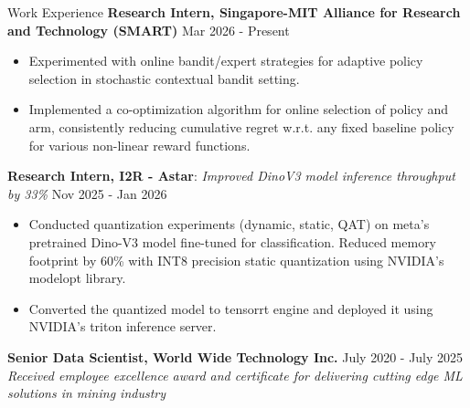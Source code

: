 \documentclass{resume} %
\begin{document}
\begin{rSection}{Work Experience}
\color{black}
\textbf{Research Intern, Singapore-MIT Alliance for Research and Technology (SMART)} \hfill Mar 2026 - Present
\begin{itemize}[leftmargin=1em,itemsep=-6pt, topsep=-5pt, before={\vspace{-0.3ex}},after=\vspace{0.5ex}]

\item \begingroup \spaceskip=2.5pt
    Experimented with online bandit/expert strategies for adaptive policy selection in stochastic contextual bandit setting.
\endgroup
\item \begingroup \spaceskip=2.5pt
    Implemented a co-optimization algorithm for online selection of policy and arm, consistently reducing cumulative regret w.r.t. any fixed baseline policy for various non-linear reward functions.
\endgroup
\end{itemize}

\vspace{-2pt}
\textbf{Research Intern, I2R - Astar}: \emph{Improved DinoV3 model inference throughput by 33\%} \hfill Nov 2025 - Jan 2026
\begin{itemize}[leftmargin=1em,itemsep=-6pt, topsep=-5pt, before={\vspace{-0.3ex}},after=\vspace{0.5ex}]
\item  \begingroup
	\spaceskip=2.5pt
		Conducted quantization experiments (dynamic, static, QAT) on meta's pretrained Dino-V3 model fine-tuned for classification. Reduced memory footprint by 60\% with INT8 precision static quantization using NVIDIA's modelopt library.
	\endgroup
\item Converted the quantized model to tensorrt engine and deployed it using NVIDIA's triton inference server.
\end{itemize}

\vspace{-2pt}
\textbf{Senior Data Scientist, World Wide Technology Inc.} \hfill July 2020 - July 2025
\\ \emph{Received employee excellence award and certificate for delivering cutting edge ML solutions in mining industry}
 \begin{itemize}[leftmargin=1em,rightmargin=0.2in ,itemsep=-5pt, topsep=-5pt, before={\vspace{0.0ex}},after=\vspace{-1ex}]


\end{itemize}
\end{rSection}
\end{document}
